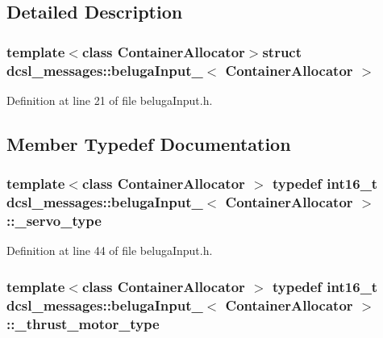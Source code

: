 \subsection{\-Detailed \-Description}
\subsubsection*{template$<$class Container\-Allocator$>$struct dcsl\-\_\-messages\-::beluga\-Input\-\_\-$<$ Container\-Allocator $>$}



\-Definition at line 21 of file beluga\-Input.\-h.



\subsection{\-Member \-Typedef \-Documentation}
\subsubsection[{\-\_\-servo\-\_\-type}]{\setlength{\rightskip}{0pt plus 5cm}template$<$class Container\-Allocator $>$ typedef int16\-\_\-t {\bf dcsl\-\_\-messages\-::beluga\-Input\-\_\-}$<$ \-Container\-Allocator $>$\-::{\bf \-\_\-servo\-\_\-type}}\label{structdcsl__messages_1_1belugaInput___a6d7d7b050e17000047e566310236ae9d}


\-Definition at line 44 of file beluga\-Input.\-h.

\subsubsection[{\-\_\-thrust\-\_\-motor\-\_\-type}]{\setlength{\rightskip}{0pt plus 5cm}template$<$class Container\-Allocator $>$ typedef int16\-\_\-t {\bf dcsl\-\_\-messages\-::beluga\-Input\-\_\-}$<$ \-Container\-Allocator $>$\-::{\bf \-\_\-thrust\-\_\-motor\-\_\-type}}\label{structdcsl__messages_1_1belugaInput___a65fe2f3273db34d20ea5c278e3201888}


